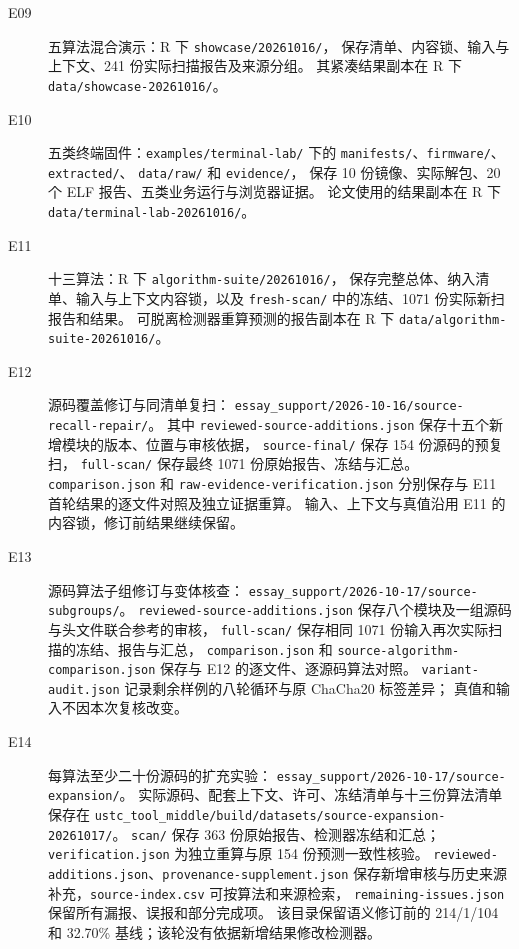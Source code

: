 \begin{description}
  \item[E09] 五算法混合演示：R 下 \nolinkurl{showcase/20261016/}，
  保存清单、内容锁、输入与上下文、241 份实际扫描报告及来源分组。
  其紧凑结果副本在 R 下 \nolinkurl{data/showcase-20261016/}。

  \item[E10] 五类终端固件：\nolinkurl{examples/terminal-lab/} 下的
  \nolinkurl{manifests/}、\nolinkurl{firmware/}、\nolinkurl{extracted/}、
  \nolinkurl{data/raw/} 和 \nolinkurl{evidence/}，
  保存 10 份镜像、实际解包、20 个 ELF 报告、五类业务运行与浏览器证据。
  论文使用的结果副本在 R 下 \nolinkurl{data/terminal-lab-20261016/}。

  \item[E11] 十三算法：R 下 \nolinkurl{algorithm-suite/20261016/}，
  保存完整总体、纳入清单、输入与上下文内容锁，以及
  \nolinkurl{fresh-scan/} 中的冻结、1071 份实际新扫报告和结果。
  可脱离检测器重算预测的报告副本在 R 下 \nolinkurl{data/algorithm-suite-20261016/}。

  \item[E12] 源码覆盖修订与同清单复扫：
  \nolinkurl{essay_support/2026-10-16/source-recall-repair/}。
  其中 \nolinkurl{reviewed-source-additions.json} 保存十五个新增模块的版本、位置与审核依据，
  \nolinkurl{source-final/} 保存 154 份源码的预复扫，
  \nolinkurl{full-scan/} 保存最终 1071 份原始报告、冻结与汇总。
  \nolinkurl{comparison.json} 和 \nolinkurl{raw-evidence-verification.json}
  分别保存与 E11 首轮结果的逐文件对照及独立证据重算。
  输入、上下文与真值沿用 E11 的内容锁，修订前结果继续保留。

  \item[E13] 源码算法子组修订与变体核查：
  \nolinkurl{essay_support/2026-10-17/source-subgroups/}。
  \nolinkurl{reviewed-source-additions.json} 保存八个模块及一组源码与头文件联合参考的审核，
  \nolinkurl{full-scan/} 保存相同 1071 份输入再次实际扫描的冻结、报告与汇总，
  \nolinkurl{comparison.json} 和 \nolinkurl{source-algorithm-comparison.json}
  保存与 E12 的逐文件、逐源码算法对照。
  \nolinkurl{variant-audit.json} 记录剩余样例的八轮循环与原 ChaCha20 标签差异；
  真值和输入不因本次复核改变。

  \item[E14] 每算法至少二十份源码的扩充实验：
  \nolinkurl{essay_support/2026-10-17/source-expansion/}。
  实际源码、配套上下文、许可、冻结清单与十三份算法清单保存在
  \nolinkurl{ustc_tool_middle/build/datasets/source-expansion-20261017/}。
  \nolinkurl{scan/} 保存 363 份原始报告、检测器冻结和汇总；
  \nolinkurl{verification.json} 为独立重算与原 154 份预测一致性核验。
  \nolinkurl{reviewed-additions.json}、\nolinkurl{provenance-supplement.json}
  保存新增审核与历史来源补充，\nolinkurl{source-index.csv} 可按算法和来源检索，
  \nolinkurl{remaining-issues.json} 保留所有漏报、误报和部分完成项。
  该目录保留语义修订前的 214/1/104 和 32.70\% 基线；该轮没有依据新增结果修改检测器。


\end{description}
